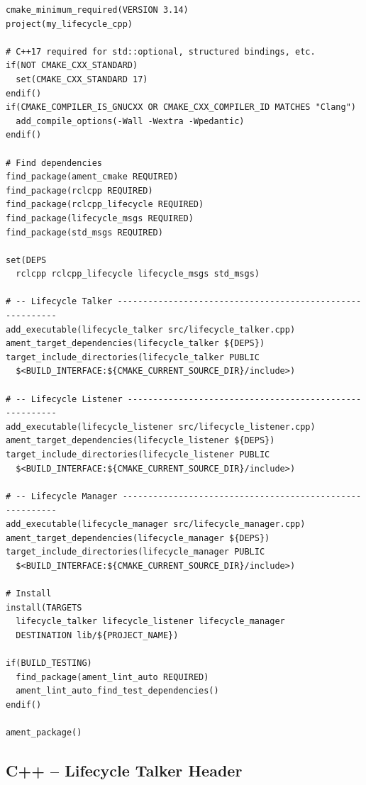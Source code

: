 \documentclass[12pt,a4paper]{article}
\begin{document}
\begin{lstlisting}[style=bash,caption={CMakeLists.txt}]
cmake_minimum_required(VERSION 3.14)
project(my_lifecycle_cpp)

# C++17 required for std::optional, structured bindings, etc.
if(NOT CMAKE_CXX_STANDARD)
  set(CMAKE_CXX_STANDARD 17)
endif()
if(CMAKE_COMPILER_IS_GNUCXX OR CMAKE_CXX_COMPILER_ID MATCHES "Clang")
  add_compile_options(-Wall -Wextra -Wpedantic)
endif()

# Find dependencies
find_package(ament_cmake REQUIRED)
find_package(rclcpp REQUIRED)
find_package(rclcpp_lifecycle REQUIRED)
find_package(lifecycle_msgs REQUIRED)
find_package(std_msgs REQUIRED)

set(DEPS
  rclcpp rclcpp_lifecycle lifecycle_msgs std_msgs)

# -- Lifecycle Talker ----------------------------------------------------------
add_executable(lifecycle_talker src/lifecycle_talker.cpp)
ament_target_dependencies(lifecycle_talker ${DEPS})
target_include_directories(lifecycle_talker PUBLIC
  $<BUILD_INTERFACE:${CMAKE_CURRENT_SOURCE_DIR}/include>)

# -- Lifecycle Listener --------------------------------------------------------
add_executable(lifecycle_listener src/lifecycle_listener.cpp)
ament_target_dependencies(lifecycle_listener ${DEPS})
target_include_directories(lifecycle_listener PUBLIC
  $<BUILD_INTERFACE:${CMAKE_CURRENT_SOURCE_DIR}/include>)

# -- Lifecycle Manager ---------------------------------------------------------
add_executable(lifecycle_manager src/lifecycle_manager.cpp)
ament_target_dependencies(lifecycle_manager ${DEPS})
target_include_directories(lifecycle_manager PUBLIC
  $<BUILD_INTERFACE:${CMAKE_CURRENT_SOURCE_DIR}/include>)

# Install
install(TARGETS
  lifecycle_talker lifecycle_listener lifecycle_manager
  DESTINATION lib/${PROJECT_NAME})

if(BUILD_TESTING)
  find_package(ament_lint_auto REQUIRED)
  ament_lint_auto_find_test_dependencies()
endif()

ament_package()
\end{lstlisting}

\subsection{C++ -- Lifecycle Talker Header}
\end{document}
